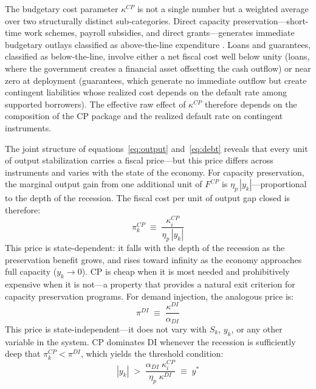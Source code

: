 \documentclass[12pt, a4paper]{article}
\begin{document}
The budgetary cost parameter $\kappa^{CP}$ is not a single number but a weighted average over two structurally distinct sub-categories. Direct capacity preservation---short-time work schemes, payroll subsidies, and direct grants---generates immediate budgetary outlays classified as above-the-line expenditure \citep{imf2022fiscalmonitor}. Loans and guarantees, classified as below-the-line, involve either a net fiscal cost well below unity (loans, where the government creates a financial asset offsetting the cash outflow) or near zero at deployment (guarantees, which generate no immediate outflow but create contingent liabilities whose realized cost depends on the default rate among supported borrowers). The effective raw effect of $\kappa^{CP}$ therefore depends on the composition of the CP package and the realized default rate on contingent instruments.

The joint structure of equations~\eqref{eq:output} and~\eqref{eq:debt} reveals that every unit of output stabilization carries a fiscal price---but this price differs across instruments and varies with the state of the economy. For capacity preservation, the marginal output gain from one additional unit of $F^{CP}$ is $\eta_p\,|y_k|$---proportional to the depth of the recession. The fiscal cost per unit of output gap closed is therefore:
%
\begin{equation}
    \pi^{CP}_k \;\equiv\; 
    \frac{\kappa^{CP}_i}{\eta_p\,|y_k|}
    \label{eq:price_CP}
\end{equation}
%
This price is state-dependent: it falls with the depth of the recession as the preservation benefit grows, and rises toward infinity as the economy approaches full capacity ($y_k \to 0$). CP is cheap when it is most needed and prohibitively expensive when it is not---a property that provides a natural exit criterion for capacity preservation programs. For demand injection, the analogous price is:
%
\begin{equation}
    \pi^{DI} \;\equiv\; 
    \frac{\kappa^{DI}}{\alpha_{\textit{DI}}}
    \label{eq:price_DI}
\end{equation}
%
This price is state-independent---it does not vary with $S_k$, $y_k$, or any other variable in the system. CP dominates DI whenever the recession is sufficiently deep that $\pi^{CP}_k < \pi^{DI}$, which yields the threshold condition:
%
\begin{equation}
    |y_k| \;>\; \frac{\alpha_{\textit{DI}}\;\kappa^{CP}_i}{\eta_p\;\kappa^{DI}}
    \;\equiv\; y^*
    \label{eq:threshold}
\end{equation}
%
\end{document}
